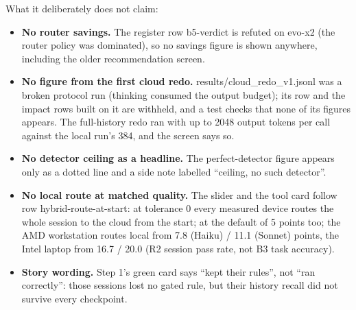 \documentclass[11pt]{article}
\begin{document}
What it deliberately does not claim:
\begin{itemize}
\item \textbf{No router savings.} The register row b5-verdict is refuted on evo-x2 (the router policy was dominated), so
  no savings figure is shown anywhere, including the older recommendation screen.
\item \textbf{No figure from the first cloud redo.} results/cloud\_redo\_v1.jsonl was a broken protocol run (thinking
  consumed the output budget); its row and the impact rows built on it are withheld, and a test checks that none of
  its figures appears. The full-history redo ran with up to 2048 output tokens per call against the local run's 384,
  and the screen says so.
\item \textbf{No detector ceiling as a headline.} The perfect-detector figure appears only as a dotted line and a side
  note labelled ``ceiling, no such detector''.
\item \textbf{No local route at matched quality.} The slider and the tool card follow row hybrid-route-at-start: at
  tolerance 0 every measured device routes the whole session to the cloud from the start; at the default of 5 points
  too; the AMD workstation routes local from 7.8 (Haiku) / 11.1 (Sonnet) points, the Intel laptop from 16.7 / 20.0
  (R2 session pass rate, not B3 task accuracy).
\item \textbf{Story wording.} Step 1's green card says ``kept their rules'', not ``ran correctly'': those sessions lost
  no gated rule, but their history recall did not survive every checkpoint.
\end{itemize}
\end{document}

